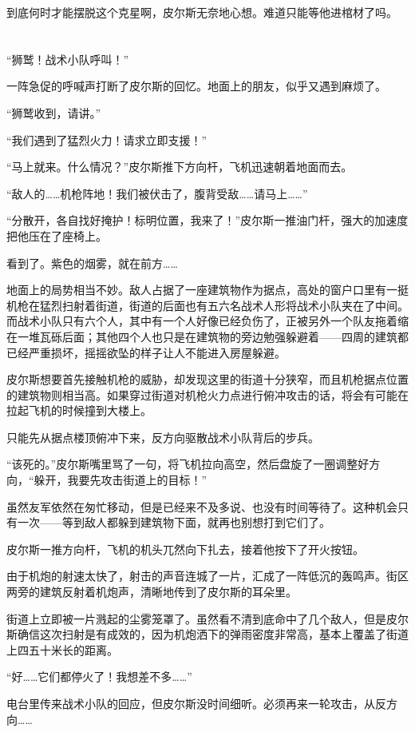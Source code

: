 到底何时才能摆脱这个克星啊，皮尔斯无奈地心想。难道只能等他进棺材了吗。

\section*{}

“狮鹫！战术小队呼叫！”

一阵急促的呼喊声打断了皮尔斯的回忆。地面上的朋友，似乎又遇到麻烦了。

“狮鹫收到，请讲。”

“我们遇到了猛烈火力！请求立即支援！”

“马上就来。什么情况？”皮尔斯推下方向杆，飞机迅速朝着地面而去。

“敌人的……机枪阵地！我们被伏击了，腹背受敌……请马上……”

“分散开，各自找好掩护！标明位置，我来了！”皮尔斯一推油门杆，强大的加速度把他压在了座椅上。

看到了。紫色的烟雾，就在前方……

地面上的局势相当不妙。敌人占据了一座建筑物作为据点，高处的窗户口里有一挺机枪在猛烈扫射着街道，街道的后面也有五六名战术人形将战术小队夹在了中间。而战术小队只有六个人，其中有一个人好像已经负伤了，正被另外一个队友拖着缩在一堆瓦砾后面；其他四个人也只是在建筑物的旁边勉强躲避着——四周的建筑都已经严重损坏，摇摇欲坠的样子让人不能进入房屋躲避。

皮尔斯想要首先接触机枪的威胁，却发现这里的街道十分狭窄，而且机枪据点位置的建筑物则相当高。如果穿过街道对机枪火力点进行俯冲攻击的话，将会有可能在拉起飞机的时候撞到大楼上。

只能先从据点楼顶俯冲下来，反方向驱散战术小队背后的步兵。

“该死的。”皮尔斯嘴里骂了一句，将飞机拉向高空，然后盘旋了一圈调整好方向，“躲开，我要先攻击街道上的目标！”

虽然友军依然在匆忙移动，但是已经来不及多说、也没有时间等待了。这种机会只有一次——等到敌人都躲到建筑物下面，就再也别想打到它们了。

皮尔斯一推方向杆，飞机的机头兀然向下扎去，接着他按下了开火按钮。

由于机炮的射速太快了，射击的声音连城了一片，汇成了一阵低沉的轰鸣声。街区两旁的建筑反射着机炮声，清晰地传到了皮尔斯的耳朵里。

街道上立即被一片溅起的尘雾笼罩了。虽然看不清到底命中了几个敌人，但是皮尔斯确信这次扫射是有成效的，因为机炮洒下的弹雨密度非常高，基本上覆盖了街道上四五十米长的距离。

“好……它们都停火了！我想差不多……”

电台里传来战术小队的回应，但皮尔斯没时间细听。必须再来一轮攻击，从反方向……

